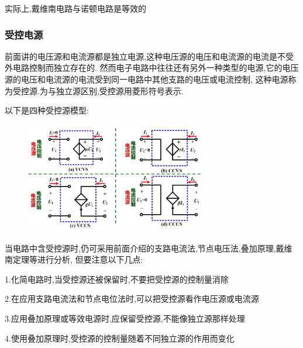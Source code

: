 \documentclass[12pt,a4paper,oneside]{ctexart}
\begin{document}
实际上,戴维南电路与诺顿电路是等效的

\subsubsection{受控电源}
前面讲的电压源和电流源都是独立电源,这种电压源的电压和电流源的电流是不受外电路控制而独立存在的.
然而电子电路中往往还有另外一种类型的电源,它的电压源的电压和电流源的电流受到同一电路中其他支路的电压或电流控制,
这种电源称为受控源.为与独立源区别,受控源用菱形符号表示.

以下是四种受控源模型:
\begin{figure}[H]
    \centering
    \includegraphics[width=8cm]{photos/四种受控源模型.png}
\end{figure}

当电路中含受控源时,仍可采用前面介绍的支路电流法,节点电压法,叠加原理,戴维南定理等进行分析,
但要注意以下几点:

1.化简电路时,当受控源还被保留时,不要把受控源的控制量消除

2.在应用支路电流法和节点电位法时,可以把受控源看作电压源或电流源

3.应用叠加原理或等效电源时,应保留受控源,不能像独立源那样处理

4.使用叠加原理时,受控源的控制量随着不同独立源的作用而变化
\end{document}
